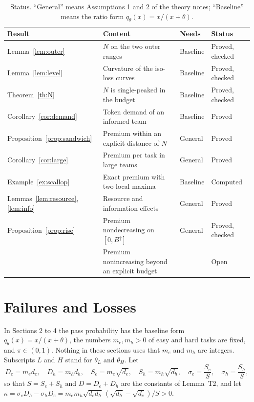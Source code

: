 \documentclass[11pt]{article}
\theoremstyle{definition}
\begin{document}
\begin{table}[htbp]
\centering
\small
\begin{tabular}{@{}llll@{}}
\toprule
Result & Content & Needs & Status \\
\midrule
Lemma~\ref{lem:outer} & $N$ on the two outer ranges & Baseline & Proved, checked \\
Lemma~\ref{lem:level} & Curvature of the iso-loss curves & Baseline & Proved, checked \\
Theorem~\ref{th:N} & $N$ is single-peaked in the budget & Baseline & Proved, checked \\
Corollary~\ref{cor:demand} & Token demand of an informed team & Baseline & Proved \\
Proposition~\ref{prop:sandwich} & Premium within an explicit distance of $N$ & General & Proved \\
Corollary~\ref{cor:large} & Premium per task in large teams & General & Proved \\
Example~\ref{ex:scallop} & Exact premium with two local maxima & Baseline & Computed \\
Lemmas~\ref{lem:resource}, \ref{lem:info} & Resource and information effects & General & Proved \\
Proposition~\ref{prop:rise} & Premium nondecreasing on $[0,B^{\uparrow}]$ & General & Proved, checked \\
& Premium nonincreasing beyond an explicit budget & & Open \\
\bottomrule
\end{tabular}
\caption{Status. ``General'' means Assumptions 1 and 2 of the theory notes; ``Baseline'' means the ratio form $q_\theta(x)=x/(x+\theta)$.}
\end{table}

\section{Failures and Losses}

In Sections 2 to 4 the pass probability has the baseline form $q_\theta(x)=x/(x+\theta)$, the numbers $m_e,m_h>0$ of easy and hard tasks are fixed, and $\pi\in(0,1)$. Nothing in these sections uses that $m_e$ and $m_h$ are integers. Subscripts $L$ and $H$ stand for $\theta_L$ and $\theta_H$. Let
\[
D_e=m_ed_e,\quad D_h=m_hd_h,\quad S_e=m_e\sqrt{d_e},\quad S_h=m_h\sqrt{d_h},\quad \sigma_e=\frac{S_e}{S},\quad \sigma_h=\frac{S_h}{S},
\]
so that $S=S_e+S_h$ and $D=D_e+D_h$ are the constants of Lemma~T2, and let $\kappa=\sigma_eD_h-\sigma_hD_e=m_em_h\sqrt{d_ed_h}\,(\sqrt{d_h}-\sqrt{d_e})/S>0$.
\end{document}
